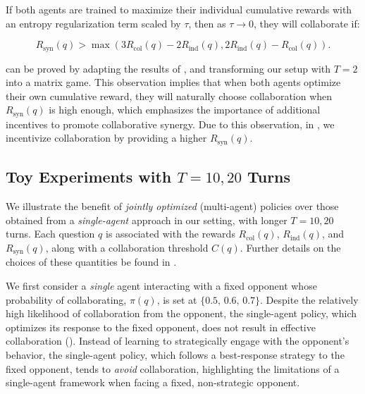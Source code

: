 \safevspace{-2.2 mm}

\begin{observation}[Informal]  
\label{claim:2}
If both agents are trained to maximize their individual cumulative rewards with an entropy regularization term scaled by $\tau$, then as $\tau \to 0$, they will collaborate if:


\safevspace{-6.2mm}
{\small
\[
R_{\text{syn}}(q) > \max( 3R_{\text{col}}(q) - 2R_{\text{ind}}(q), 2R_{\text{ind}}(q) - R_{\text{col}}(q)).
\]
}
\end{observation}  


\safevspace{-1.9mm}
{ can be proved by adapting the results of \citet{zhang2016quantal}, and transforming our setup with \(T=2\) into a matrix game.} This observation implies that when both agents optimize their own {cumulative} reward, they will naturally choose collaboration when \( R_{\text{syn}}(q) \) is high enough, which emphasizes the importance of additional incentives to promote collaborative synergy. Due to this observation, in , we incentivize collaboration by providing a higher \( R_{\text{syn}}(q) \).  


\safevspace{-2mm}


\subsection{Toy Experiments with \(T=10, 20\) Turns}
\label{ssec:exp-toy}
We illustrate the benefit of \textit{jointly optimized} (multi-agent) policies over {those obtained from a} \textit{single-agent} approach in our setting, with longer \(T=10, 20\) turns.  Each question \(q\) is associated with the  rewards \(R_{\text{col}}(q)\), \(R_{\text{ind}}(q)\), and \(R_{\text{syn}}(q)\), along with a collaboration threshold \(C(q)\).  Further details on the choices of these quantities be found in .

{We first consider a \textit{single} agent interacting with a fixed opponent whose probability of collaborating, \(\pi(q)\), is set at \(\{0.5,\,0.6,\,0.7\}\). Despite the relatively high likelihood of collaboration from the opponent, the single-agent policy, which optimizes its response to the fixed opponent, does not result in effective collaboration (). Instead of learning to strategically engage with the opponent’s behavior, the single-agent policy, which follows a best-response strategy to the fixed opponent, tends to \textit{avoid} collaboration, highlighting the limitations of a single-agent framework when facing a fixed, non-strategic opponent.}

